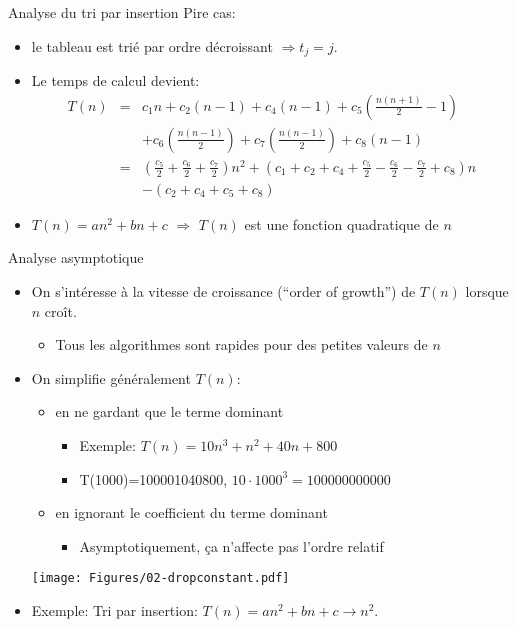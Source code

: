 \begin{frame}{Analyse du tri par insertion}
Pire cas:
\begin{itemize}
\item le tableau est trié par ordre décroissant $\Rightarrow t_j=j$.
\item Le temps de calcul devient:
{\footnotesize
\begin{eqnarray*}
T(n)&=&c_1 n+ c_2 (n-1)+c_4 (n-1)+c_5 \left( \frac{n(n+1)}{2}-1\right)\\
& & +c_6\left(\frac{n(n-1)}{2}\right)+c_7 \left(\frac{n(n-1)}{2}\right)+c_8 (n-1)\\
&=&(\frac{c_5}{2}+\frac{c_6}{2}+\frac{c_7}{2}) n^2 + (c_1+c_2+c_4+\frac{c_5}{2}-\frac{c_6}{2}-\frac{c_7}{2}+c_8)n\\
& & - (c_2+c_4+c_5+c_8)
\end{eqnarray*}
}
\item $T(n)=an^2+bn+c$ $\Rightarrow$ $T(n)$ est une fonction \alert{quadratique} de $n$
\end{itemize}

\end{frame}


\begin{frame}{Analyse asymptotique}
\begin{itemize}
\item On s'intéresse à la vitesse de croissance (``order of growth'') de $T(n)$ lorsque $n$ croît.
\begin{itemize}
\item Tous les algorithmes sont rapides pour des petites valeurs de $n$
\end{itemize}
\item On simplifie généralement $T(n)$:
\begin{itemize}
\item en ne gardant que le terme dominant
\begin{itemize}
\item Exemple: $T(n)=10 n^3+n^2+40n+800$
\item T(1000)=100001040800, $10\cdot 1000^3=100000000000$
\end{itemize}
\item en ignorant le coefficient du terme dominant
\begin{itemize}
\item Asymptotiquement, ça n'affecte pas l'ordre relatif
\end{itemize}
\end{itemize}
\centerline{\texttt{[image: Figures/02-dropconstant.pdf]}}
\item Exemple: Tri par insertion: $T(n)=an^2+bn+c \rightarrow n^2$.
\end{itemize}
\end{frame}

